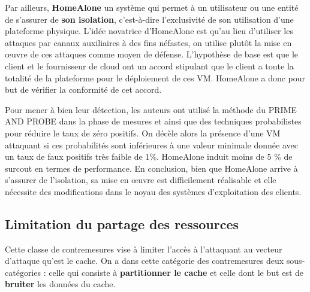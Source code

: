 Par ailleurs, \textbf{ HomeAlone}  \cite{HomeAlone}  un système qui permet à un utilisateur ou une entité de s’assurer de \textbf{ son isolation}, c’est-à-dire l’exclusivité de son utilisation d’une plateforme physique. L’idée novatrice d’HomeAlone est qu’au lieu d’utiliser les attaques par canaux auxiliaires à des fins néfastes, on utilise plutôt la mise en œuvre  de ces attaques comme moyen de défense.  L’hypothèse de base est que le client  et le fournisseur de cloud  ont un accord  stipulant que le client a toute la totalité de  la plateforme pour le déploiement de ces VM. HomeAlone a donc pour but de vérifier la conformité de cet accord. 
\par Pour mener à bien leur détection, les auteurs ont  utilisé la méthode du PRIME AND PROBE dans la phase de mesures et ainsi que des techniques   probabilistes pour réduire le taux de zéro positifs. On décèle alors la présence d’une VM attaquant si ces probabilités sont inférieures à une valeur minimale donnée avec un taux de faux positifs très faible de 1\%. HomeAlone induit moins de 5 \% de surcout en termes de performance.
En  conclusion, bien que HomeAlone arrive à s’assurer de l’isolation, sa mise en œuvre est difficilement  réalisable et elle nécessite des modifications dans le noyau des systèmes d’exploitation des clients.

\subsection{Limitation du partage des ressources}


Cette classe de contremesures  vise à limiter l’accès à l’attaquant au vecteur d’attaque qu’est le cache.  On a dans cette catégorie des contremesures deux sous-catégories : celle qui consiste à \textbf{partitionner le cache} et celle dont le but est de \textbf{bruiter} les données du cache. \newline

\par

